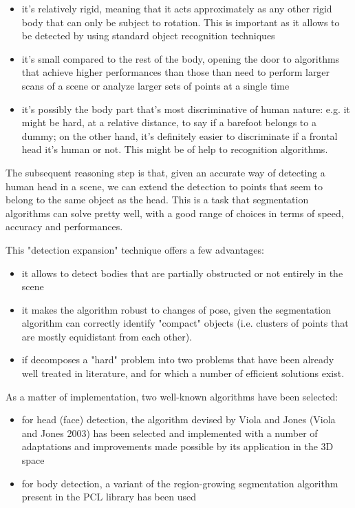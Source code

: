 \documentclass[a4paper,11pt,titlepage]{article}
\begin{document}
\begin{itemize}
  \item it's relatively rigid, meaning that it acts approximately as any other rigid
  body that can only be subject to rotation. This is important as it allows to
  be detected by using standard object recognition techniques
  \item it's small compared to the rest of the body, opening the door to algorithms
  that achieve higher performances than those than need to perform larger scans
  of a scene or analyze larger sets of points at a single time
  \item it's possibly the body part that's most discriminative of human nature: e.g.
  it might be hard, at a relative distance, to say if a barefoot belongs to a
  dummy; on the other hand, it's definitely easier to discriminate if a frontal
  head it's human or not. This might be of help to recognition algorithms.
\end{itemize}

The subsequent reasoning step is that, given an accurate way of detecting a
human head in a scene, we can extend the detection to points that seem to
belong to the same object as the head. This is a task that segmentation
algorithms can solve pretty well, with a good range of choices in terms of
speed, accuracy and performances.

This "detection expansion" technique offers a few advantages:

\begin{itemize}
  \item it allows to detect bodies that are partially obstructed or not entirely in
  the scene
  \item it makes the algorithm robust to changes of pose, given the segmentation
  algorithm can correctly identify "compact" objects (i.e. clusters of points
  that are mostly equidistant from each other).
  \item if decomposes a "hard" problem into two problems that have been already well
  treated in literature, and for which a number of efficient solutions exist.
\end{itemize}

As a matter of implementation, two well-known algorithms have been selected:

\begin{itemize}
  \item for head (face) detection, the algorithm devised by Viola and Jones (Viola and
  Jones 2003) has been selected and implemented with a number of adaptations and
  improvements made possible by its application in the 3D space
  \item for body detection, a variant of the region-growing segmentation algorithm
  present in the PCL library has been used
\end{itemize}
\end{document}
